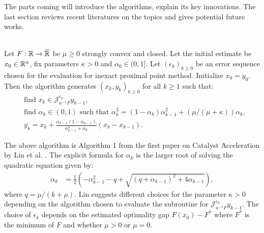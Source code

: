 \documentclass[12pt]{article}
\begin{document}
        \par
        The parts coming will introduce the algorithms, explain its key innovations. 
        The last section reviews recent literatures on the topics and gives potential future works. 
        \begin{definition}\label{def:lin-catalyst-original}\; \\
            Let $F:\mathbb R \rightarrow \overline {\mathbb R}$ be $\mu \ge 0$ strongly convex and closed. 
            Let the initial estimate be $x_0 \in \mathbb R^n$, fix parameters $\kappa > 0$ and $\alpha_0 \in (0, 1]$. 
            Let $(\epsilon_k)_{k \ge 0}$ be an error sequence chosen for the evaluation for inexact proximal point method. 
            Initialize $x_0 = y_0$. Then the algorithm generates $(x_k, y_k)_{k\ge 0}$ for all $k \ge 1$ such that: 
            \begin{align*}
                & \text{find } x_k \in \mathcal J_{\kappa^{-1}F}^{\epsilon_k} y_{k - 1}, 
                \\
                & \text{find } \alpha_k \in (0, 1) \text{ such that } \alpha_k^2 = (1 - \alpha_k)\alpha_{k - 1}^2 + (\mu/(\mu + \kappa))\alpha_k,
                \\
                & 
                y_{k} = x_k + \frac{\alpha_{k - 1}(1 - \alpha_{k - 1})}{\alpha_{k - 1}^2 + \alpha_k}(x_k - x_{k - 1}). 
            \end{align*}
        \end{definition}
        \begin{remark}
            The above algorithm is Algorithm 1 from the first paper on Catalyst Acceleration by Lin et al. \cite{lin_universal_2015}. 
            The explicit formula for $\alpha_k$ is the larger root of solving the quadratic equation given by: 
            \begin{align*}
                \alpha_k &= 
                \frac{1}{2}\left(
                    - \alpha_{k - 1}^2 - q + \sqrt{(q + \alpha_{k - 1})^2 + 4 \alpha_{k - 1}}
                \right), 
            \end{align*}
            where $q = \mu/(k + \mu)$. 
            Lin suggests different choices for the parameter $\kappa > 0$ depending on the algorithm chosen to evaluate the subroutine for $\mathcal J_{\kappa^{-1}F}^{\epsilon_k}y_{k - 1}$. 
            The choice of $\epsilon_k$ depends on the estimated optimality gap $F(x_0) - F^*$ where $F^*$ is the minimum of $F$ and whether $\mu > 0$ or $\mu = 0$. 
        \end{remark}
\end{document}
